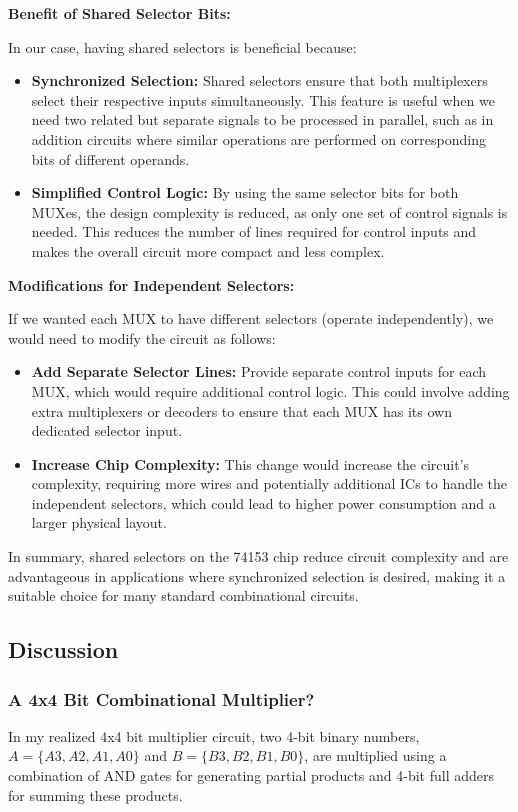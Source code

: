 \documentclass[12pt]{article}
\begin{document}
\textbf{Benefit of Shared Selector Bits:}

In our case, having shared selectors is beneficial because:
\begin{itemize}
	\item \textbf{Synchronized Selection:} Shared selectors ensure that both multiplexers select their respective inputs simultaneously. This feature is useful when we need two related but separate signals to be processed in parallel, such as in addition circuits where similar operations are performed on corresponding bits of different operands.
	\item \textbf{Simplified Control Logic:} By using the same selector bits for both MUXes, the design complexity is reduced, as only one set of control signals is needed. This reduces the number of lines required for control inputs and makes the overall circuit more compact and less complex.
\end{itemize}

\textbf{Modifications for Independent Selectors:}

If we wanted each MUX to have different selectors (operate independently), we would need to modify the circuit as follows:
\begin{itemize}
	\item \textbf{Add Separate Selector Lines:} Provide separate control inputs for each MUX, which would require additional control logic. This could involve adding extra multiplexers or decoders to ensure that each MUX has its own dedicated selector input.
	\item \textbf{Increase Chip Complexity:} This change would increase the circuit’s complexity, requiring more wires and potentially additional ICs to handle the independent selectors, which could lead to higher power consumption and a larger physical layout.
\end{itemize}
In summary, shared selectors on the 74153 chip reduce circuit complexity and are advantageous in applications where synchronized selection is desired, making it a suitable choice for many standard combinational circuits.
\subsection*{Discussion}
\subsubsection*{A 4x4 Bit Combinational Multiplier?}
In my realized 4x4 bit multiplier circuit, two 4-bit binary numbers, \( A = \{A3, A2, A1, A0\} \) and \( B = \{B3, B2, B1, B0\} \), are multiplied using a combination of AND gates for generating partial products and 4-bit full adders for summing these products.
\end{document}
